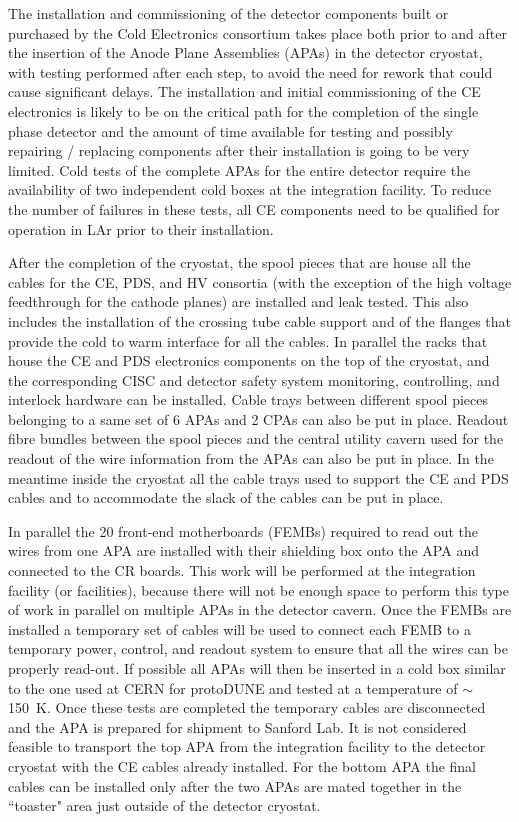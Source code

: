 The installation and commissioning of the detector components built or
purchased by the Cold Electronics consortium takes place both prior to
and after the insertion of the Anode Plane Assemblies (APAs) in the
detector cryostat, with testing performed after each step, to avoid the
need for rework that could cause significant delays. The installation and
initial commissioning of the CE electronics is likely to be on the critical
path for the completion of the single phase detector and the amount of
time available for testing and possibly repairing / replacing components
after their installation is going to be very limited. Cold tests of the complete
APAs for the entire detector require the
availability of two independent cold boxes at the integration facility.
To reduce the number of failures in these tests, all CE components need
to be qualified for operation in LAr prior to their installation.

After the completion of the cryostat, the spool pieces that are house all the
cables for the CE, PDS, and HV consortia (with the exception of the high
voltage feedthrough for the cathode planes) are installed and leak tested.
This also includes the installation of the crossing tube cable support and of
the flanges that provide the cold to warm interface for all the cables.
In parallel the racks that house the CE and PDS electronics components on
the top of the cryostat, and the corresponding CISC and detector safety
system monitoring, controlling, and interlock hardware can be installed.
Cable trays between different spool pieces belonging to a same set of 6 APAs
and 2 CPAs can also be put in place. Readout fibre bundles between the
spool pieces and the central utility cavern used for the readout of the wire
information from the APAs can also be put in place. In the meantime inside
the cryostat all the cable trays used to support the CE and PDS cables and to
accommodate the slack of the cables can be put in place.

In parallel the 20 front-end motherboards (FEMBs) required to read out the
wires from one APA are installed with their shielding box onto the APA and
connected to the CR boards. This work will be performed at the integration
facility (or facilities), because there will not be enough space to perform
this type of work in parallel on multiple APAs in the detector cavern. Once
the FEMBs are installed a temporary set of cables will be
used to connect each FEMB to a temporary power, control, and readout system
to ensure that all the wires can be properly read-out. If possible all APAs
will then be inserted in a cold box similar
to the one used at CERN for protoDUNE and tested at a temperature of
$\sim$150~K. Once these tests
are completed the temporary cables are disconnected and the APA is prepared
for shipment to Sanford Lab. It is not considered feasible to transport the
top APA from the integration facility to the detector cryostat with the
CE cables already installed. For the bottom APA the final cables can be
installed only after the two APAs are mated together in the ``toaster" area
just outside of the detector cryostat.

